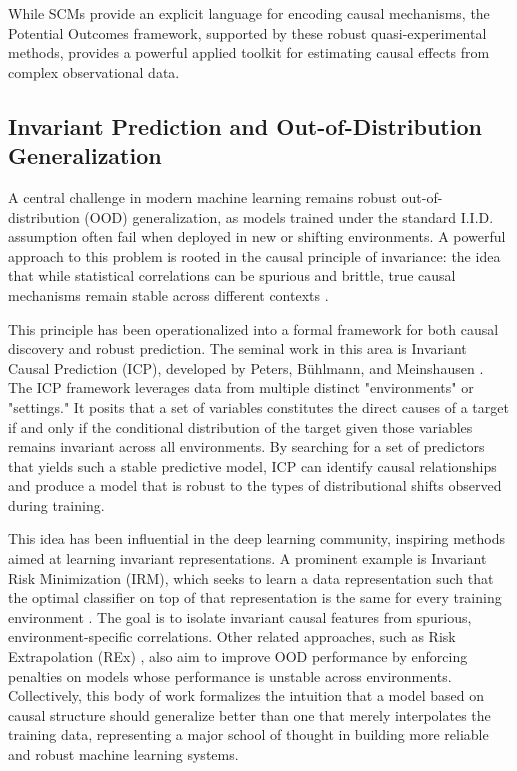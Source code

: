 {{While SCMs provide an explicit language for encoding causal mechanisms, the Potential Outcomes framework, supported by these robust quasi-experimental methods, provides a powerful applied toolkit for estimating causal effects from complex observational data. 

\subsection{Invariant Prediction and Out-of-Distribution Generalization}

A central challenge in modern machine learning remains robust out-of-distribution (OOD) generalization, as models trained under the standard I.I.D. assumption often fail when deployed in new or shifting environments. A powerful approach to this problem is rooted in the causal principle of invariance: the idea that while statistical correlations can be spurious and brittle, true causal mechanisms remain stable across different contexts \cite{pearl2000causality}.

This principle has been operationalized into a formal framework for both causal discovery and robust prediction. The seminal work in this area is Invariant Causal Prediction (ICP), developed by Peters, Bühlmann, and Meinshausen \cite{peters2016invariant}. The ICP framework leverages data from multiple distinct "environments" or "settings." It posits that a set of variables constitutes the direct causes of a target if and only if the conditional distribution of the target given those variables remains invariant across all environments. By searching for a set of predictors that yields such a stable predictive model, ICP can identify causal relationships and produce a model that is robust to the types of distributional shifts observed during training.

This idea has been influential in the deep learning community, inspiring methods aimed at learning invariant representations. A prominent example is Invariant Risk Minimization (IRM), which seeks to learn a data representation such that the optimal classifier on top of that representation is the same for every training environment \cite{arjovsky2019invariant}. The goal is to isolate invariant causal features from spurious, environment-specific correlations. Other related approaches, such as Risk Extrapolation (REx) \cite{krueger2021out}, also aim to improve OOD performance by enforcing penalties on models whose performance is unstable across environments. Collectively, this body of work formalizes the intuition that a model based on causal structure should generalize better than one that merely interpolates the training data, representing a major school of thought in building more reliable and robust machine learning systems.

}}
